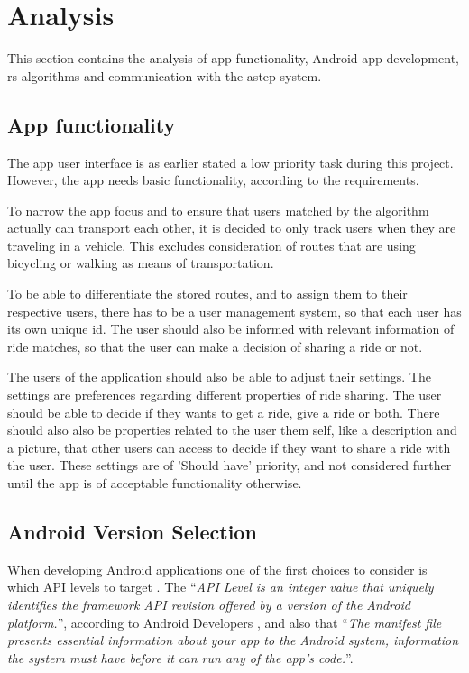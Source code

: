 \section{Analysis}
This section contains the analysis of app functionality, Android app development, \gls{rs} algorithms and communication with the \gls{astep} system.

\subsection{App functionality}
The app user interface is as earlier stated a low priority task during this project.
However, the app needs basic functionality, according to the requirements.

To narrow the app focus and to ensure that users matched by the algorithm actually can transport each other, it is decided to only track users when they are traveling in a vehicle.
This excludes consideration of routes that are using bicycling or walking as means of transportation.

To be able to differentiate the stored routes, and to assign them to their respective users, there has to be a user management system, so that each user has its own unique id.
The user should also be informed with relevant information of ride matches, so that the user can make a decision of sharing a ride or not.

The users of the application should also be able to adjust their settings.
The settings are preferences regarding different properties of ride sharing.
The user should be able to decide if they wants to get a ride, give a ride or both.
There should also also be properties related to the user them self, like a description and a picture, that other users can access to decide if they want to share a ride with the user.
These settings are of 'Should have' priority, and not considered further until the app is of acceptable functionality otherwise.

\subsection{Android Version Selection}
When developing Android applications one of the first choices to consider is which API levels to target \cite{usesSDK}.
The ``\textit{API Level is an integer value that uniquely identifies the framework API revision offered by a version of the Android platform.}'', according to Android Developers \cite{usesSDK}, and also that ``\textit{The manifest file presents essential information about your app to the Android system, information the system must have before it can run any of the app's code.}''.


